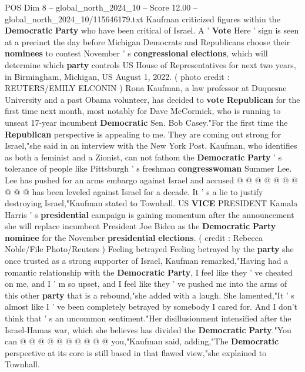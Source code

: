 \begin{textsample}{POS Dim 8 – global\_north\_2024\_10 – Score 12.00 – global\_north\_2024\_10/115646179.txt}  \label{ex:f8_pos_165}
Kaufman criticized figures within the \textbf{Democratic} \textbf{Party} who have been critical of Israel.
A ' \textbf{Vote} Here ' sign is seen at a precinct the day before Michigan Democrats and Republicans choose their \textbf{nominees} to contest November ' s \textbf{congressional} \textbf{elections}, which will determine which \textbf{party} controls US House of Representatives for next two years, in Birmingham, Michigan, US August 1, 2022. ( photo credit : REUTERS/EMILY ELCONIN ) Rona Kaufman, a law professor at Duquesne University and a past Obama volunteer, has decided to \textbf{vote} \textbf{Republican} for the first time next month, most notably for Dave McCormick, who is running to unseat 17-year incumbent \textbf{Democratic} Sen.
Bob Casey."For the first time the \textbf{Republican} perspective is appealing to me.
They are coming out strong for Israel,"she said in an interview with the New York Post.
Kaufman, who identifies as both a feminist and a Zionist, can not fathom the \textbf{Democratic} \textbf{Party} ' s tolerance of people like Pittsburgh ' s freshman \textbf{congresswoman} Summer Lee.
Lee has pushed for an arms embargo against Israel and accused @ @ @ @ @ @ @ @ @ @ has been leveled against Israel for a decade.
It ' s a lie to justify destroying Israel,"Kaufman stated to Townhall.
US \textbf{VICE} PRESIDENT Kamala Harris ' s \textbf{presidential} campaign is gaining momentum after the announcement she will replace incumbent President Joe Biden as the \textbf{Democratic} \textbf{Party} \textbf{nominee} for the November \textbf{presidential} \textbf{elections}. ( credit : Rebecca Noble/File Photo/Reuters ) Feeling betrayed Feeling betrayed by the \textbf{party} she once trusted as a strong supporter of Israel, Kaufman remarked,"Having had a romantic relationship with the \textbf{Democratic} \textbf{Party}, I feel like they ' ve cheated on me, and I ' m so upset, and I feel like they ' ve pushed me into the arms of this other \textbf{party} that is a rebound,"she added with a laugh.
She lamented,"It ' s almost like I ' ve been completely betrayed by somebody I cared for.
And I don't think that ' s an uncommon sentiment."Her disillusionment intensified after the Israel-Hamas war, which she believes has divided the \textbf{Democratic} \textbf{Party}."You can @ @ @ @ @ @ @ @ @ @ you,"Kaufman said, adding,"The \textbf{Democratic} perspective at its core is still based in that flawed view,"she explained to Townhall.

\end{textsample}

